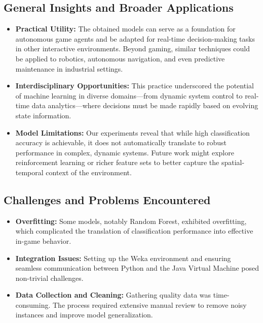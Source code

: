 \documentclass[12pt,a4paper]{article}
\begin{document}
\subsection*{General Insights and Broader Applications}
\begin{itemize}
    \item \textbf{Practical Utility:}  
    The obtained models can serve as a foundation for autonomous game agents and be adapted for real-time decision-making tasks in other interactive environments. Beyond gaming, similar techniques could be applied to robotics, autonomous navigation, and even predictive maintenance in industrial settings.
    
    \item \textbf{Interdisciplinary Opportunities:}  
    This practice underscored the potential of machine learning in diverse domains—from dynamic system control to real-time data analytics—where decisions must be made rapidly based on evolving state information.
    
    \item \textbf{Model Limitations:}  
    Our experiments reveal that while high classification accuracy is achievable, it does not automatically translate to robust performance in complex, dynamic systems. Future work might explore reinforcement learning or richer feature sets to better capture the spatial-temporal context of the environment.
\end{itemize}

\subsection*{Challenges and Problems Encountered}
\begin{itemize}
    \item \textbf{Overfitting:}  
    Some models, notably Random Forest, exhibited overfitting, which complicated the translation of classification performance into effective in-game behavior.
    
    \item \textbf{Integration Issues:}  
    Setting up the Weka environment and ensuring seamless communication between Python and the Java Virtual Machine posed non-trivial challenges.
    
    \item \textbf{Data Collection and Cleaning:}  
    Gathering quality data was time-consuming. The process required extensive manual review to remove noisy instances and improve model generalization.
\end{itemize}
\end{document}
